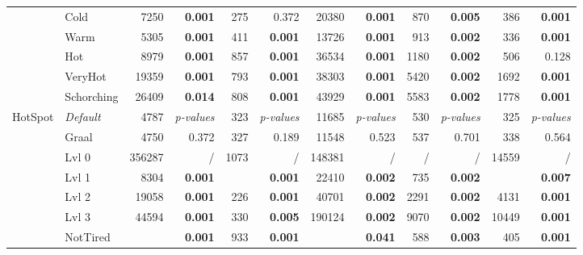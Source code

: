 \begin{table*}
{\begin{tabular}{cl|rr|rr|rr|rr|rr|}
            & Cold         & 7250       & \bf 0.001    & 275       & 0.372        & 20380       & \bf 0.001    & 870  & \bf 0.005    & 386       & \bf 0.001    \\
            & Warm         & 5305       & \bf 0.001    & 411       & \bf 0.001    & 13726       & \bf 0.001    & 913  & \bf 0.002    & 336       & \bf 0.001    \\
            & Hot          & 8979       & \bf 0.001    & 857       & \bf 0.001    & 36534       & \bf 0.001    & 1180 & \bf 0.002    & 506       & 0.128        \\
            & VeryHot      & 19359      & \bf 0.001    & 793       & \bf 0.001    & 38303       & \bf 0.001    & 5420 & \bf 0.002    & 1692      & \bf 0.001    \\
            & Schorching   & 26409      & \bf 0.014    & 808       & \bf 0.001    & 43929       & \bf 0.001    & 5583 & \bf 0.002    & 1778      & \bf 0.001    \\
            \hline
            \multirow{5}{*}{\sc HotSpot} 
            & \em Default       & 4787       & \em p-values & 323       & \em p-values & 11685       & \em p-values & 530  & \em p-values & 325       & \em p-values \\
            & Graal            & 4750       & 0.372        & 327       & 0.189        & 11548       & 0.523        & 537  & 0.701        & 338       & 0.564        \\
            & Lvl 0            & 356287     & /            & 1073      & /            & 148381      & /            & /    & /            & 14559     & /            \\
            & Lvl 1       & 8304       & \bf 0.001    & \best 222 & \bf 0.001    & 22410       & \bf 0.002    & 735  & \bf 0.002    & \best 277 & \bf 0.007    \\
            & Lvl 2            & 19058      & \bf 0.001    & 226       & \bf 0.001    & 40701       & \bf 0.002    & 2291 & \bf 0.002    & 4131      & \bf 0.001    \\
            & Lvl 3            & 44594      & \bf 0.001    & 330       & \bf 0.005    & 190124      & \bf 0.002    & 9070 & \bf 0.002    & 10449     & \bf 0.001    \\
            & NotTired  & \best 3844 & \bf 0.001    & 933       & \bf  0.001   & \best 11256 & \bf 0.041    & 588  & \bf 0.003    & 405       & \bf 0.001    \\
            
            \bottomrule
        \end{tabular}
    }

\end{table*}